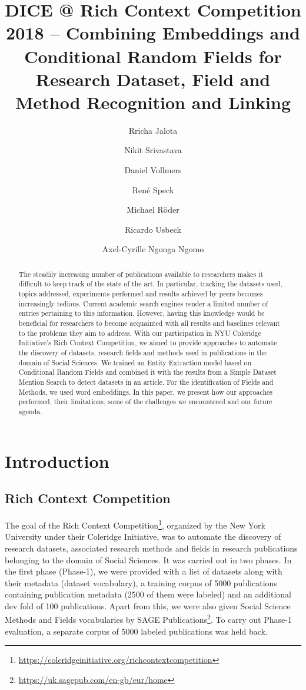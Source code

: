 \documentclass[runningheads]{llncs}
\title{DICE @ Rich Context Competition 2018 -- Combining Embeddings and Conditional Random Fields for Research Dataset, Field and Method Recognition and Linking}
\author{Rricha Jalota \and Nikit Srivastava \and Daniel Vollmers \and René Speck \and Michael R\"oder \and Ricardo Usbeck\orcidID{0000-0002-0191-7211} \and Axel-Cyrille {Ngonga Ngomo}}
\institute{
Data Science Group, Paderborn University, Germany\\
\email{firstname.lastname@uni-paderborn.de}
}
\begin{document}
\maketitle

\begin{abstract}
    The steadily increasing number of publications available to researchers makes it difficult to keep track of the state of the art. In particular, tracking the datasets used, topics addressed, experiments performed and results achieved by peers becomes increasingly tedious. Current academic search engines %
    render a limited number of entries pertaining to this information. However, having this knowledge would be beneficial for researchers to become acquainted with all results and baselines relevant to the problems they aim to address. With our participation in NYU Coleridge Initiative’s Rich Context Competition, we aimed to provide approaches to automate the discovery of datasets, research fields and methods used in publications in the domain of Social Sciences. We trained an Entity Extraction model based on Conditional Random Fields and combined it with the results from a Simple Dataset Mention Search to detect datasets in an article.  For the identification of Fields and Methods, we used word embeddings. In this paper, we present how our approaches performed, their limitations, some of the challenges we encountered and our future agenda. 
\end{abstract}

\section{Introduction}
\subsection{Rich Context Competition}
The goal of the Rich Context Competition\footnote{\url{https://coleridgeinitiative.org/richcontextcompetition}}, organized by the New York University under their Coleridge Initiative, was to automate the discovery of research datasets, associated research methods and fields in research publications belonging to the domain of Social Sciences. It was carried out in two phases. 
In the first phase (Phase-1), we were provided with a list of datasets along with their metadata (dataset vocabulary), a training corpus of 5000 publications containing publication metadata (2500 of them were labeled) and an additional dev fold of 100 publications. Apart from this, we were also given Social Science Methods and Fields vocabularies by SAGE Publications\footnote{\url{https://uk.sagepub.com/en-gb/eur/home}}. To carry out Phase-1 evaluation, a separate corpus of 5000 labeled publications was held back.
\end{document}
